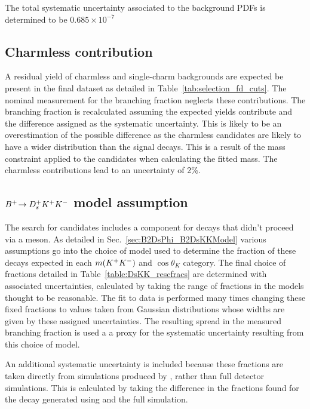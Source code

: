 The total systematic uncertainty associated to the background PDFs is determined to be $0.685\times 10^{-7}$

\subsection{Charmless contribution}
A residual yield of charmless and single-charm backgrounds are expected be present in the final dataset as detailed in Table~\ref{tab:selection_fd_cuts}. The nominal measurement for the branching fraction neglects these contributions. The branching fraction is recalculated assuming the expected yields contribute and the difference assigned as the systematic uncertainty. This is likely to be an overestimation of the possible difference as the charmless candidates are likely to have a wider distribution than the signal decays. This is a result of the \Dsp mass constraint applied to the candidates when calculating the fitted \Bp mass. 
The charmless contributions lead to an uncertainty of 2\%.

\subsection{${{{B}^+}}\!\rightarrow {\ensuremath{{D}^+_{s}}}{\ensuremath{{K}^+}}{\ensuremath{{K}^-}}$ model assumption}
The search for \decay{\Bp}{\Dsp\phiz} candidates includes a component for \decay{\Bp}{\Dsp\Kp\Km} decays that didn't proceed via a \phiz meson. As detailed in Sec.~\ref{sec:B2DsPhi_B2DsKKModel} various assumptions go into the choice of \decay{\Bp}{\Dsp\Kp\Km} model used to determine the fraction of these decays expected in each $m({{K}^+}{{K}^-})$ and $\cos{\theta_{K}}$ category. The final choice of fractions detailed in Table~\ref{table:DsKK_rescfracs} are determined with associated uncertainties, calculated by taking the range of fractions in the models thought to be reasonable. The fit to data is performed many times changing these fixed fractions to values taken from Gaussian distributions whose widths are given by these assigned uncertainties. The resulting spread in the measured branching fraction is used a a proxy for the systematic uncertainty resulting from this choice of model. 

An additional systematic uncertainty is included because these fractions are taken directly from simulations produced by \laurapp, rather than full detector simulations. This is calculated by taking the difference in the fractions found for the \decay{\Bp}{\Dsp\phiz} decay generated using \laurapp and the full \lhcb simulation.  


